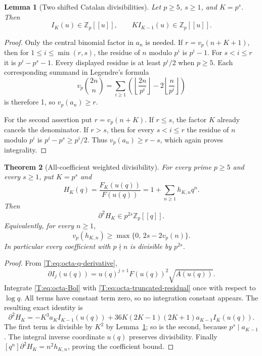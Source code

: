 \documentclass[11pt,a4paper]{article}
\newtheorem{theorem}{Theorem}[section]
\newtheorem{lemma}[theorem]{Lemma}
\theoremstyle{definition}\newtheorem{definition}[theorem]{Definition}
\theoremstyle{remark}\newtheorem{remark}[theorem]{Remark}
\numberwithin{equation}{section}
\begin{document}
\begin{lemma}[Two shifted Catalan divisibilities]
\label{T:lem:octa-primitives}
Let $p\geq5$, $s\geq1$, and $K=p^s$.  Then
\[
 I_K(u)\in\mathbb Z_p[[u]],\qquad
 K I_{K-1}(u)\in\mathbb Z_p[[u]].
\]
\end{lemma}
\begin{proof}
Only the central binomial factor in $a_n$ is needed.
If $r=v_p(n+K+1)$, then for $1\leq i\leq\min(r,s)$,
the residue of $n$ modulo $p^i$ is $p^i-1$.
For $s<i\leq r$ it is $p^i-p^s-1$.
Every displayed residue is at least $p^i/2$ when $p\geq5$.
Each corresponding summand in Legendre's formula
\[
 v_p\binom{2n}{n}
 =\sum_{i\geq1}\left(\left\lfloor\frac{2n}{p^i}\right\rfloor
                    -2\left\lfloor\frac n{p^i}\right\rfloor\right)
\]
is therefore 1, so $v_p(a_n)\geq r$.

For the second assertion put $r=v_p(n+K)$.
If $r\leq s$, the factor $K$ already cancels the denominator.
If $r>s$, then for every $s<i\leq r$ the residue of $n$
modulo $p^i$ is $p^i-p^s\geq p^i/2$.
Thus $v_p(a_n)\geq r-s$, which again proves integrality.
\end{proof}

\begin{theorem}[All-coefficient weighted divisibility]
\label{T:thm:octa-weighted}
For every prime $p\geq5$ and every $s\geq1$, put $K=p^s$ and
\[
 H_K(q)=\frac{F_K(u(q))}{F(u(q))}=1+\sum_{n\geq1}h_{K,n}q^n.
\]
Then
\begin{equation}\label{T:eq:octa-second-derivative}
 \partial^2H_K\in p^{2s}\mathbb Z_p[[q]].
\end{equation}
Equivalently, for every $n\geq1$,
\begin{equation}\label{T:eq:octa-weighted-coeff}
 v_p(h_{K,n})\geq\max\{0,\,2s-2v_p(n)\}.
\end{equation}
In particular every coefficient with $p\nmid n$ is divisible by $p^{2s}$.
\end{theorem}
\begin{proof}
From \eqref{T:eq:octa-q-derivative},
\[
 \partial I_j(u(q))
       =u(q)^{j+1}F(u(q))^2\sqrt{A(u(q))}.
\]
Integrate \eqref{T:eq:octa-Bol} with \eqref{T:eq:octa-truncated-residual}
once with respect to $\log q$.  All terms have constant term zero,
so no integration constant appears.  The resulting exact identity is
\begin{equation}\label{T:eq:octa-integrated-residual}
 \partial^2H_K
 =-K^3a_K I_{K-1}(u(q))
  +36K(2K-1)(2K+1)a_{K-1}I_K(u(q)).
\end{equation}
The first term is divisible by $K^2$ by
Lemma~\ref{T:lem:octa-primitives}; so is the second, because
$p^s\mid a_{K-1}$.
The integral inverse coordinate $u(q)$ preserves divisibility.
Finally $[q^n]\partial^2H_K=n^2h_{K,n}$, proving the coefficient bound.
\end{proof}
\end{document}
